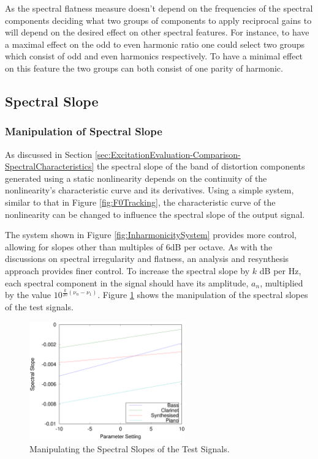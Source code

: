 			As the spectral flatness measure doesn't depend on the frequencies of the spectral components
			deciding what two groups of components to apply reciprocal gains to will depend on the desired
			effect on other spectral features. For instance, to have a maximal effect on the odd to even
			harmonic ratio one could select two groups which consist of odd and even harmonics respectively. To
			have a minimal effect on this feature the two groups can both consist of one parity of harmonic.

	\subsection{Spectral Slope}
	\label{sec:FeatureControl-Parameterisation-Slope}
		\subsubsection*{Manipulation of Spectral Slope}
			As discussed in Section \ref{sec:ExcitationEvaluation-Comparison-SpectralCharacteristics} the
			spectral slope of the band of distortion components generated using a static nonlinearity depends
			on the continuity of the nonlinearity's characteristic curve and its derivatives. Using a simple
			system, similar to that in Figure \ref{fig:F0Tracking}, the characteristic curve of the
			nonlinearity can be changed to influence the spectral slope of the output signal.

			The system shown in Figure \ref{fig:InharmonicitySystem} provides more control, allowing for slopes
			other than multiples of 6dB per octave. As with the discussions on spectral irregularity and
			flatness, an analysis and resynthesis approach provides finer control.  To increase the spectral
			slope by $k$ dB per Hz, each spectral component in the signal should have its amplitude, $a_{n}$,
			multiplied by the value $10^{\frac{k}{20}(\nu_{n} - \nu_{1})}$. Figure \ref{fig:MoveSlopes} shows
			the manipulation of the spectral slopes of the test signals.

			\begin{figure}[h!]
				\centering
				\includegraphics[width=0.6\textwidth]{chapter6/Images/MoveSlopes.eps}
				\caption{Manipulating the Spectral Slopes of the Test Signals.}
				\label{fig:MoveSlopes}
			\end{figure}

